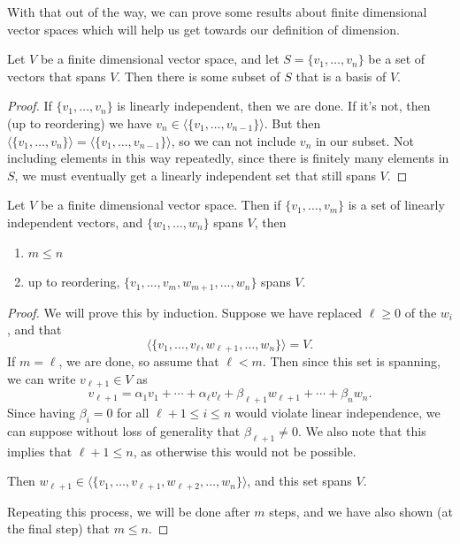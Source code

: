 With that out of the way, we can prove some results about finite dimensional vector spaces which will help us get towards our definition of dimension. 

\begin{lemma}
    Let $V$ be a finite dimensional vector space, and let $S = \{v_1, \dots, v_n\}$ be a set of vectors that spans $V$. Then there is some subset of $S$ that is a basis of $V$.
\end{lemma}
\begin{proof}
    If $\{v_1, \dots, v_n\}$ is linearly independent, then we are done. If it's not, then (up to reordering) we have $v_n \in \langle\{v_1, \dots, v_{n - 1}\}\rangle$. But then $\langle\{v_1, \dots, v_n\}\rangle = \langle\{v_1, \dots, v_{n - 1}\}\rangle$, so we can not include $v_n$ in our subset. Not including elements in this way repeatedly, since there is finitely many elements in $S$, we must eventually get a linearly independent set that still spans $V$.
\end{proof}

\begin{theorem}
    Let $V$ be a finite dimensional vector space. Then if $\{v_1, \dots, v_m\}$ is a set of linearly independent vectors, and $\{w_1, \dots, w_n\}$ spans $V$, then
    \begin{enumerate}[label=(\roman*)]
        \item $m \leq n$
        \item up to reordering, $\{v_1, \dots, v_m, w_{m + 1}, \dots, w_n\}$ spans $V$.
    \end{enumerate}
\end{theorem}
\begin{proof}
    We will prove this by induction. Suppose we have replaced $\ell \geq 0$ of the $w_i$, and that
    $$
    \langle \{ v_1, \dots, v_\ell, w_{\ell + 1}, \dots, w_n\}\rangle = V.
    $$
    If $m = \ell$, we are done, so assume that $\ell < m$. Then since this set is spanning, we can write $v_{\ell + 1} \in V$ as
    $$
    v_{\ell+1} = \alpha_1 v_1 + \cdots + \alpha_{\ell} v_{\ell} + \beta_{\ell + 1} w_{\ell + 1} + \cdots + \beta_n w_n.
    $$ 
    Since having $\beta_i = 0$ for all $\ell + 1 \leq i \leq n$ would violate linear independence, we can suppose without loss of generality that $\beta_{\ell + 1} \neq 0$. We also note that this implies that $\ell + 1 \leq n$, as otherwise this would not be possible.

    Then $w_{\ell + 1} \in \langle \{v_1, \dots, v_{\ell + 1}, w_{\ell + 2}, \dots, w_{n} \} \rangle$, and this set spans $V$.

    Repeating this process, we will be done after $m$ steps, and we have also shown (at the final step) that $m \leq n$.
\end{proof}

